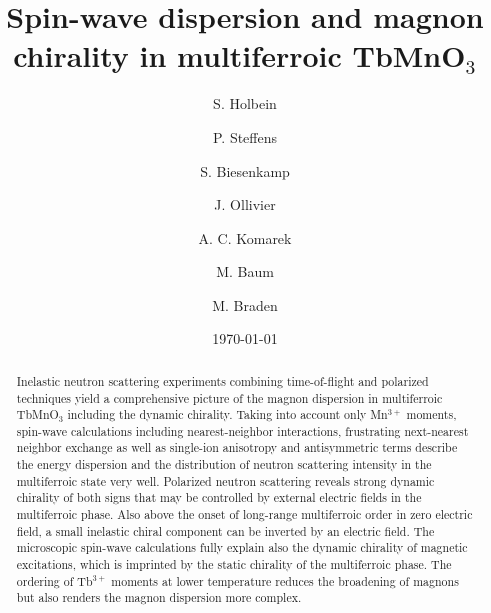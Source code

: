 \documentclass[aps,prb,twocolumn,superscriptaddress,showpacs,floatfix]{revtex4-2}
\begin{document}
\title{Spin-wave dispersion and magnon chirality in multiferroic TbMnO$_3$}

\author{S. Holbein}

\author{P. Steffens}%

\author{S. Biesenkamp}

\author{J. Ollivier}%

\author{A. C. Komarek}%

\author{M. Baum}

\author{M. Braden}
\date{\today}


\begin{abstract}

Inelastic neutron scattering experiments combining time-of-flight and polarized techniques yield
a comprehensive picture of the magnon dispersion in multiferroic TbMnO$_3$ including the dynamic chirality.
Taking into account only Mn$^{3+}$ moments, spin-wave calculations
including nearest-neighbor interactions, frustrating next-nearest
neighbor  exchange as well as single-ion anisotropy and antisymmetric terms
describe the energy dispersion and the distribution of neutron scattering intensity in
the multiferroic state very well. 
Polarized neutron scattering reveals strong dynamic chirality  of
both signs that may be controlled by external electric fields in the multiferroic phase.
Also above the onset of long-range multiferroic order in zero electric field, a small inelastic
chiral component can be inverted by an electric field.
The microscopic spin-wave calculations fully explain also the dynamic chirality
of magnetic excitations, which is imprinted by the static chirality of the multiferroic phase. 
The ordering of Tb$^{3+}$ moments at lower temperature reduces the broadening of magnons
but also renders the magnon dispersion more complex.

\end{abstract}
\end{document}
